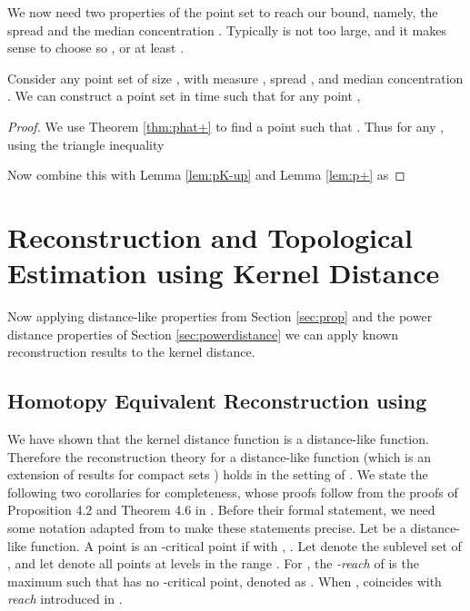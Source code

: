 \documentclass[11pt]{myclass}
\begin{document}
We now need two properties of the point set  to reach our bound, namely, the spread  and the median concentration . Typically  is not too large, and it makes sense to choose  so , or at least .  





\begin{theorem}
\label{thm:powK-up-hat}
Consider  any point set  of size , with measure , spread , and median concentration .  We can construct a point set  in  time such that for any point , 
  
\end{theorem}
\begin{proof}
We use Theorem \ref{thm:phat+} to find a point  such that . Thus for any , using the triangle inequality

Now combine this with Lemma \ref{lem:pK-up} and Lemma \ref{lem:p+} as

\end{proof}






\section{Reconstruction and Topological Estimation using Kernel Distance}
\label{sec:recon}

Now applying distance-like properties from Section \ref{sec:prop} and the power distance properties of Section \ref{sec:powerdistance} we can apply known reconstruction results to the kernel distance.  

\subsection{Homotopy Equivalent Reconstruction using }

We have shown that the kernel distance function  is a distance-like function.
Therefore the reconstruction theory for a distance-like function \cite{ChazalCohen-SteinerMerigot2011} (which is an extension of results for compact sets \cite{ChazalCohen-SteinerLieutier2009}) 
holds in the setting of . 
We state the following two corollaries for completeness, whose proofs follow from the proofs of Proposition 4.2 and Theorem 4.6 in \cite{ChazalCohen-SteinerMerigot2011}.  
Before their formal statement, we need some notation adapted from \cite{ChazalCohen-SteinerMerigot2011} to make these statements precise.
Let  be a distance-like function. A point  is an -critical point if  with , . 
Let  denote the sublevel set of , and let  denote all points at levels in the range .  
For , the \emph{-reach} of  is the maximum  such that  has no -critical point, denoted as .   
When ,  coincides with \emph{reach} introduced in \cite{Federer1959}. 
\end{document}
